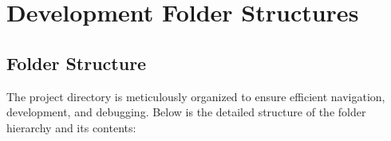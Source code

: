 %
%

\chapter{Development Folder Structures}

\section{Folder Structure}

The project directory is meticulously organized to ensure efficient navigation, development, and debugging. Below is the detailed structure of the folder hierarchy and its contents:

